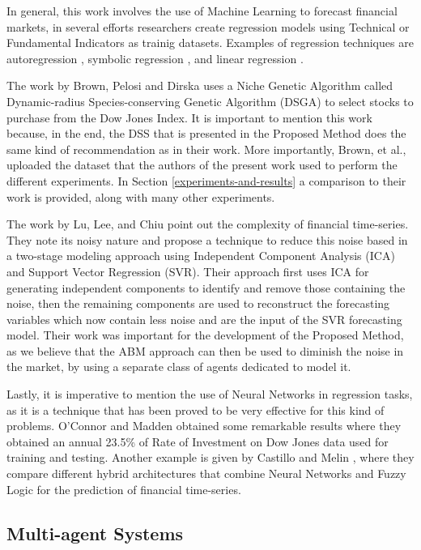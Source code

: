 \documentclass[12pt,journal,draftcls,onecolumn]{IEEEtran}
\begin{document}
In general, this work involves the use of Machine Learning to forecast financial markets, in several efforts researchers create regression models using Technical or Fundamental Indicators as trainig datasets. Examples of regression techniques are autoregression \cite{burg1968new}, symbolic regression \cite{billard2002symbolic}, and linear regression \cite{kutner2004applied}. 

The work by Brown, Pelosi and Dirska \cite{brown2013dynamic} uses a Niche Genetic Algorithm called Dynamic-radius Species-conserving Genetic Algorithm (DSGA) to select stocks to purchase from the Dow Jones Index. It is important to mention this work because, in the end, the DSS that is presented in the Proposed Method does the same kind of recommendation as in their work. More importantly, Brown, et al., uploaded the dataset that the authors of the present work used to perform the different experiments. In Section \ref{experiments-and-results} a comparison to their work is provided, along with many other experiments.

The work by Lu, Lee, and Chiu \cite{Lu2009} point out the complexity of financial time-series. They note its noisy nature and propose a technique to reduce this noise based in a two-stage modeling approach using Independent Component Analysis (ICA) and Support Vector Regression (SVR). Their approach first uses ICA for generating independent components to identify and remove those containing the noise, then the remaining components are used to reconstruct the forecasting variables which now contain less noise and are the input of the SVR forecasting model. Their work was important for the development of the Proposed Method, as we believe that the ABM approach can then be used to diminish the noise in the market, by using a separate class of agents dedicated to model it.

Lastly, it is imperative to mention the use of Neural Networks in regression tasks, as it is a technique that has been proved to be very effective for this kind of problems. O'Connor and Madden \cite{Connor2005} obtained some remarkable results where they obtained an annual 23.5\% of Rate of Investment on Dow Jones data used for training and testing. Another example is given by Castillo and Melin \cite{castillo2001simulation}, where they compare different hybrid architectures that combine Neural Networks and Fuzzy Logic for the prediction of financial time-series.

\subsection{Multi-agent Systems}
\label{multi-agent-systems}
\end{document}
